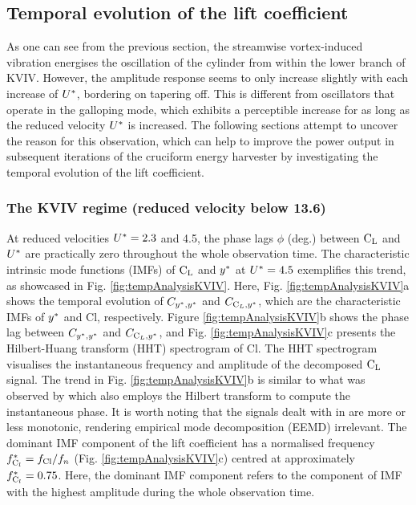 \documentclass[oneside]{utmthesis}
\begin{document}
\subsection{Temporal evolution of the lift coefficient} \label{ssec:tempEvo}
As one can see from the previous section, the streamwise vortex-induced vibration energises the oscillation of the cylinder from within the lower branch of KVIV. However, the amplitude response seems to only increase slightly with each increase of $U^{*}$, bordering on tapering off. This is different from oscillators that operate in the galloping mode, which exhibits a perceptible increase for as long as the reduced velocity $U^{*}$ is increased. The following sections attempt to uncover the reason for this observation, which can help to improve the power output in subsequent iterations of the cruciform energy harvester by investigating the temporal evolution of the lift coefficient.

\subsubsection{The KVIV regime (reduced velocity below 13.6)} \label{sssec:phaseLag}
At reduced velocities  $U^{*} = 2.3$ and 4.5, the phase lags  $\phi$ (deg.) between $\text{C}_{\text{L}}$ and  $U^{*}$ are practically zero throughout the whole observation time. The characteristic intrinsic mode functions (IMFs) of $\text{C}_{\text{L}}$ and  $y^{*}$ at $U^{*} = 4.5$ exemplifies this trend, as showcased in Fig. \ref{fig:tempAnalysisKVIV}. Here, Fig. \ref{fig:tempAnalysisKVIV}a shows the temporal evolution of $C_{y^{*},y^{*}}$ and $C_{\text{C}_{L},y^{*}}$, which are the characteristic IMFs of $y^{*}$ and Cl, respectively. Figure \ref{fig:tempAnalysisKVIV}b shows the phase lag between $C_{y^{*},y^{*}}$ and $C_{\text{C}_{L},y^{*}}$, and Fig. \ref{fig:tempAnalysisKVIV}c presents the Hilbert-Huang transform (HHT) spectrogram of Cl. The HHT spectrogram visualises the instantaneous frequency and amplitude of the decomposed $\text{C}_{\text{L}}$ signal. The trend in Fig. \ref{fig:tempAnalysisKVIV}b is similar to what was observed by \citet{Khalak1999} which also employs the Hilbert transform to compute the instantaneous phase. It is worth noting that the signals dealt with in \citet{Khalak1999} are more or less monotonic, rendering empirical mode decomposition (EEMD) irrelevant. The dominant IMF component of the lift coefficient has a normalised frequency $f_{\text{C}_{l}}^{*} = f_{\text{Cl}}/f_{n}$ (Fig. \ref{fig:tempAnalysisKVIV}c) centred at approximately $f_{\text{C}_{l}}^{*} = 0.75$. Here, the dominant IMF component refers to the component of IMF with the highest amplitude during the whole observation time.
\end{document}
